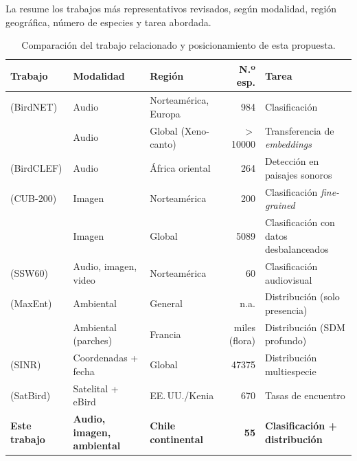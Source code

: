 La  resume los trabajos más representativos revisados,
según modalidad, región geográfica, número de especies y tarea abordada.

\begin{table}[!htb]
  \centering\footnotesize
  \caption{Comparación del trabajo relacionado y posicionamiento de esta
  propuesta.}
  \label{tab:brecha}
  \begin{tabularx}{\textwidth}{@{}>{\raggedright\arraybackslash\hsize=1.25\hsize}X
    >{\raggedright\arraybackslash\hsize=0.9\hsize}X
    >{\raggedright\arraybackslash\hsize=0.85\hsize}X
    r
    >{\raggedright\arraybackslash}X@{}}
    \toprule
    Trabajo & Modalidad & Región & N.º esp. & Tarea \\
    \midrule
    \citet{kahl2021birdnet} (BirdNET) & Audio & Norteamérica, Europa & 984 & Clasificación \\
    \citet{ghani2023embeddings} & Audio & Global (Xeno-canto) & $>$\num{10000} & Transferencia de \textit{embeddings} \\
    \citet{kahl2023birdclef} (BirdCLEF) & Audio & África oriental & 264 & Detección en paisajes sonoros \\
    \citet{wah2011cub} (CUB-200) & Imagen & Norteamérica & 200 & Clasificación \textit{fine-grained} \\
    \citet{vanhorn2018inaturalist} & Imagen & Global & \num{5089} & Clasificación con datos desbalanceados \\
    \citet{vanhorn2022ssw60} (SSW60) & Audio, imagen, video & Norteamérica & 60 & Clasificación audiovisual \\
    \citet{phillips2006maxent} (MaxEnt) & Ambiental & General & n.a. & Distribución (solo presencia) \\
    \citet{deneu2021cnn} & Ambiental (parches) & Francia & miles (flora) & Distribución (SDM profundo) \\
    \citet{cole2023sinr} (SINR) & Coordenadas + fecha & Global & \num{47375} & Distribución multiespecie \\
    \citet{teng2024satbird} (SatBird) & Satelital + eBird & EE.\,UU./Kenia & 670 & Tasas de encuentro \\
    \midrule
    \textbf{Este trabajo} & \textbf{Audio, imagen, ambiental} & \textbf{Chile continental} & \textbf{55} & \textbf{Clasificación + distribución} \\
    \bottomrule
  \end{tabularx}
\end{table}

